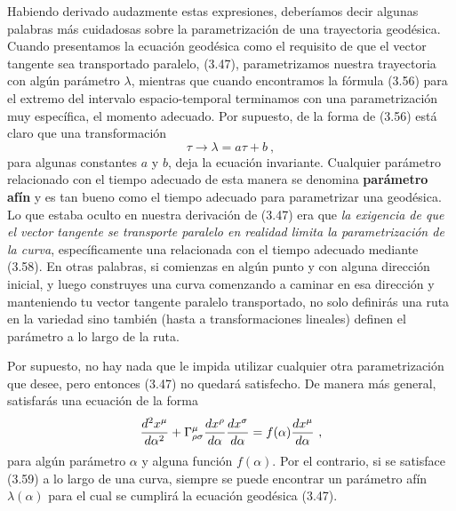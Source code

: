 \documentclass[11pt,b5paper,openany,twoside]{book}
\begin{document}
Habiendo derivado audazmente estas expresiones, deberíamos decir algunas palabras más cuidadosas sobre la parametrización de una trayectoria geodésica.
Cuando presentamos la ecuación geodésica como el requisito de que el vector tangente sea transportado paralelo, (3.47), parametrizamos nuestra trayectoria con algún parámetro $\lambda$, mientras que cuando encontramos la fórmula (3.56) para el extremo del intervalo espacio-temporal terminamos con una parametrización muy específica, el momento adecuado.
Por supuesto, de la forma de (3.56) está claro que una transformación
\begin{equation}
\tau \rightarrow \lambda = a\tau +b \ ,\label{3.58}
\end{equation}
para algunas constantes $a$ y $b$, deja la ecuación invariante.
Cualquier parámetro relacionado con el tiempo adecuado de esta manera se denomina {\bf parámetro afín} y es tan bueno como el tiempo adecuado para parametrizar una geodésica.
Lo que estaba oculto en nuestra derivación de (3.47) era que \textit{la exigencia de que el vector tangente se transporte paralelo en realidad limita la parametrización de la curva}, específicamente una relacionada con el tiempo adecuado mediante (3.58).
En otras palabras, si comienzas en algún punto y con alguna dirección inicial, y luego construyes una curva comenzando a caminar en esa dirección y manteniendo tu vector tangente paralelo transportado, no solo definirás una ruta en la variedad sino también (hasta a transformaciones lineales) definen el parámetro a lo largo de la ruta.

Por supuesto, no hay nada que le impida utilizar cualquier otra parametrización que desee, pero entonces (3.47) no quedará satisfecho.
De manera más general, satisfarás una ecuación de la forma
\begin{equation}
{{d^2x^\mu}\over{d\alpha^2}}+\Gamma^\mu_{\rho\sigma}
{{dx^\rho}\over{d\alpha}}{{dx^\sigma}\over{d\alpha}}=
f(\alpha){{dx^\mu}\over{d\alpha}}\ ,\label{3.59}
\end{equation}
para algún parámetro $\alpha$ y alguna función $f(\alpha)$.
Por el contrario, si se satisface (3.59) a lo largo de una curva, siempre se puede encontrar un parámetro afín $\lambda(\alpha)$ para el cual se cumplirá la ecuación geodésica (3.47).
\end{document}
